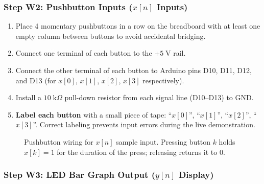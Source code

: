 \documentclass[11pt,letterpaper]{article}
\begin{document}
\subsubsection{Step W2: Pushbutton Inputs \texorpdfstring{($x[n]$ Inputs)}{(x[n] Inputs)}}

\begin{enumerate}
    \item Place 4 momentary pushbuttons in a row on the breadboard with at least one empty column between buttons to avoid accidental bridging.
    \item Connect one terminal of each button to the $+5\;\mathrm{V}$ rail.
    \item Connect the other terminal of each button to Arduino pins D10, D11, D12, and D13 (for $x[0]$, $x[1]$, $x[2]$, $x[3]$ respectively).
    \item Install a $10\;\mathrm{k}\Omega$ pull-down resistor from each signal line (D10--D13) to GND.
    \item \textbf{Label each button} with a small piece of tape: ``$x[0]$'', ``$x[1]$'', ``$x[2]$'', ``$x[3]$''. Correct labeling prevents input errors during the live demonstration.
\end{enumerate}

\begin{figure}[H]
    \centering
    \vspace{0.3in}
    \vspace{0.1in}
    \caption{Pushbutton wiring for $x[n]$ sample input. Pressing button $k$ holds $x[k] = 1$ for the duration of the press; releasing returns it to 0.}
    \label{fig:button_wiring}
\end{figure}

\subsubsection{Step W3: LED Bar Graph Output \texorpdfstring{($y[n]$ Display)}{(y[n] Display)}}
\end{document}
